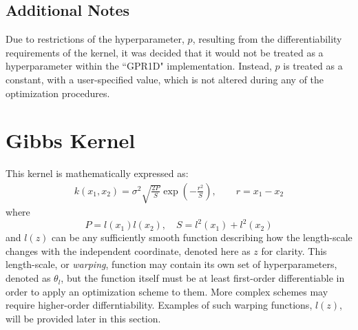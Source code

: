 \documentclass{article}
\begin{document}
\subsection{Additional Notes}
\label{subsec:MHNotes}

Due to restrictions of the hyperparameter, $p$, resulting from the differentiability requirements of the kernel, it was decided that it would not be treated as a hyperparameter within the ``GPR1D" implementation. Instead, $p$ is treated as a constant, with a user-specified value, which is not altered during any of the optimization procedures.

\begin{comment}
\section{Neural Network Kernel}
\label{sec:NNKernel}

This kernel is mathematically expressed as:
\begin{equation}
\label{eq:NNKernel}
	k\!\left(x_1,x_2\right) = \frac{2}{\pi} \left(-\frac{2 \Sigma p}{2l}\right), \qquad r = x_1 - x_2
\end{equation}
\end{comment}

\section{Gibbs Kernel}
\label{sec:GGKernel}

This kernel is mathematically expressed as:
\begin{equation}
\label{eq:GGKernel}
	\begin{gathered}
	k\!\left(x_1,x_2\right) = \sigma^2 \sqrt{\frac{2P}{S}} \exp{\left(-\frac{r^2}{S}\right)}, \qquad r = x_1 - x_2
	\end{gathered}
\end{equation}
where
\begin{equation}
\label{eq:GGKernel_PS}
	 P = l\!\left(x_1\right) l\!\left(x_2\right), \quad S = l^2\!\left(x_1\right) + l^2\!\left(x_2\right)
\end{equation}
and $l\!\left(z\right)$ can be any sufficiently smooth function describing how the length-scale changes with the independent coordinate, denoted here as $z$ for clarity. This length-scale, or \emph{warping}, function may contain its own set of hyperparameters, denoted as $\theta_l$, but the function itself must be at least first-order differentiable in order to apply an optimization scheme to them. More complex schemes may require higher-order differntiability. Examples of such warping functions, $l\!\left(z\right)$, will be provided later in this section.
\end{document}
